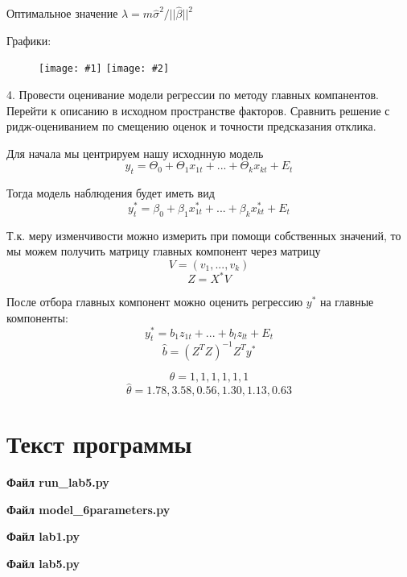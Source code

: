 ﻿\documentclass[12pt, a4paper]{article}
\newcommand{\inputTwoImages}[2]{
\begin{figure}[htbp!]
    \noindent
        \texttt{[image: \#1]}
        \texttt{[image: \#2]}
\end{figure}
}
\newcommand{\myCodeInput}[3]{
{\bf Файл #2}

}
\begin{document}
Оптимальное значение $\lambda = m \hat{\sigma}^2 / ||\hat{\beta}||^2$

Графики:

\inputTwoImages{../pics/RSS_from_lambda.png}{../pics/theta_from_lambda.png}



4. Провести оценивание модели регрессии по методу главных компанентов. Перейти к описанию
в исходном пространстве факторов. Сравнить решение с ридж-оцениванием по смещению оценок 
и точности предсказания отклика.

Для начала мы центрируем нашу исходнную модель $$y_t = \Theta_0 + \Theta_1x_{1t}+...+\Theta_kx_{kt}+E_t$$

Тогда модель наблюдения будет иметь вид $$y_t^* = \beta_0 + \beta_1x_{1t}^*+...+\beta_kx_{kt}^*+E_t$$

Т.к. меру изменчивости можно измерить при помощи собственных значений, то мы можем получить матрицу главных компонент через матрицу $$V = (v_1,...,v_k)$$
$$Z = X^*V$$

После отбора главных компонент можно оценить регрессию $y^*$ на главные компоненты:
$$y_t^* = b_1 z_{1t} + ... + b_l z_{lt} + E_t$$
$$\hat{b} = (Z^TZ)^{-1} Z^T y^* $$



\[
\theta = 1, 1, 1, 1, 1, 1
\]
\[
\hat{\theta} = 1.78, 3.58, 0.56, 1.30, 1.13, 0.63
\]

\section{Текст программы}

\myCodeInput{python}{run\_lab5.py}{../../run_lab5.py}

\myCodeInput{python}{model\_6parameters.py}{../../model_6parameters.py}

\myCodeInput{python}{lab1.py}{../../1/lab1.py}
\myCodeInput{python}{lab5.py}{../lab5.py}
\end{document}

